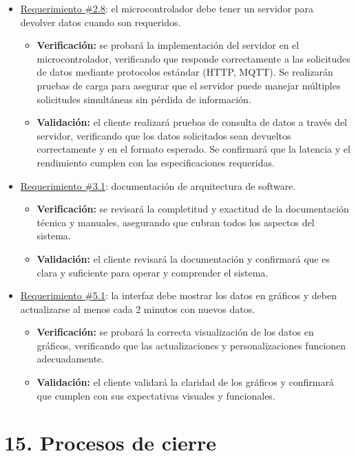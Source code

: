 \documentclass[
11pt, %
codirector, %
]{charter}
\begin{document}
\begin{itemize}
	\item \underline{Requerimiento \#2.8}: el microcontrolador debe tener un servidor para devolver datos cuando son requeridos.
		\begin{itemize}
			\item \textbf{Verificación:} se probará la implementación del servidor en el microcontrolador, verificando que responde correctamente a las solicitudes de datos mediante protocolos estándar (HTTP, MQTT). Se realizarán pruebas de carga para asegurar que el servidor puede manejar múltiples solicitudes simultáneas sin pérdida de información.
			\item \textbf{Validación:} el  cliente realizará pruebas de consulta de datos a través del servidor, verificando que los datos solicitados sean devueltos correctamente y en el formato esperado. Se confirmará que la latencia y el rendimiento cumplen con las especificaciones requeridas.
		\end{itemize}
		
	\item \underline{Requerimiento \#3.1}: documentación de arquitectura de software.
		\begin{itemize}
			\item \textbf{Verificación:} se revisará la completitud y exactitud de la documentación técnica y manuales, asegurando que cubran todos los aspectos del sistema.
			\item \textbf{Validación:} el cliente revisará la documentación y confirmará que es clara y suficiente para operar y comprender el sistema.
		\end{itemize}
		
	\item \underline{Requerimiento \#5.1}: la interfaz debe mostrar los datos en gráficos y deben actualizarse al menos cada 2 minutos con nuevos datos.
		\begin{itemize}
			\item \textbf{Verificación:} se probará la correcta visualización de los datos en gráficos, verificando que las actualizaciones y personalizaciones funcionen adecuadamente.
			\item \textbf{Validación:} el cliente validará la claridad de los gráficos y confirmará que cumplen con sus expectativas visuales y funcionales.
		\end{itemize}

\end{itemize}

\section{15. Procesos de cierre}    
\label{sec:cierre}
\end{document}
